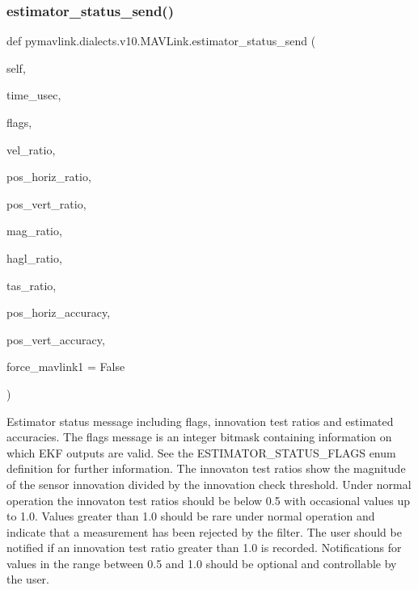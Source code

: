 \begin{DoxyVerb}
\begin{DoxyVerb}
\subsubsection{\texorpdfstring{estimator\+\_\+status\+\_\+send()}{estimator\_status\_send()}}
{\footnotesize\ttfamily def pymavlink.\+dialects.\+v10.\+M\+A\+V\+Link.\+estimator\+\_\+status\+\_\+send (\begin{DoxyParamCaption}\item[{}]{self,  }\item[{}]{time\+\_\+usec,  }\item[{}]{flags,  }\item[{}]{vel\+\_\+ratio,  }\item[{}]{pos\+\_\+horiz\+\_\+ratio,  }\item[{}]{pos\+\_\+vert\+\_\+ratio,  }\item[{}]{mag\+\_\+ratio,  }\item[{}]{hagl\+\_\+ratio,  }\item[{}]{tas\+\_\+ratio,  }\item[{}]{pos\+\_\+horiz\+\_\+accuracy,  }\item[{}]{pos\+\_\+vert\+\_\+accuracy,  }\item[{}]{force\+\_\+mavlink1 = {\ttfamily False} }\end{DoxyParamCaption})}

\begin{DoxyVerb}Estimator status message including flags, innovation test ratios and
estimated accuracies. The flags message is an integer
bitmask containing information on which EKF outputs
are valid. See the ESTIMATOR_STATUS_FLAGS enum
definition for further information. The innovaton test
ratios show the magnitude of the sensor innovation
divided by the innovation check threshold. Under
normal operation the innovaton test ratios should be
below 0.5 with occasional values up to 1.0. Values
greater than 1.0 should be rare under normal operation
and indicate that a measurement has been rejected by
the filter. The user should be notified if an
innovation test ratio greater than 1.0 is recorded.
Notifications for values in the range between 0.5 and
1.0 should be optional and controllable by the user.


\end{DoxyVerb}
\end{DoxyVerb}
\end{DoxyVerb}
